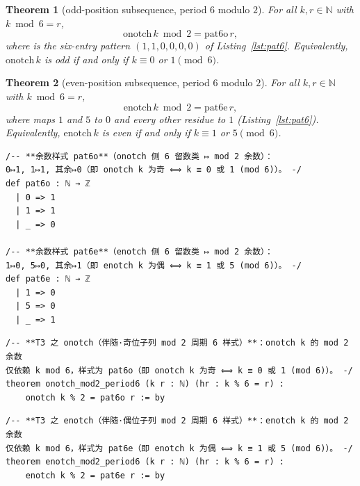\documentclass[11pt]{article}
\newtheorem{theorem}{Theorem}
\theoremstyle{definition}
\begin{document}
\begin{theorem}[odd-position subsequence, period $6$ modulo $2$]\label{thm:pat6o}
For all $k,r\in\mathbb{N}$ with $k\bmod 6=r$,
\[
  \mathrm{onotch}\,k \bmod 2 = \mathrm{pat6o}\,r,
\]
where  is the six-entry pattern $(1,1,0,0,0,0)$ of
Listing~\ref{lst:pat6}. Equivalently, $\mathrm{onotch}\,k$ is odd if and only
if $k\equiv 0$ or $1\pmod 6$.
\end{theorem}

\begin{theorem}[even-position subsequence, period $6$ modulo $2$]\label{thm:pat6e}
For all $k,r\in\mathbb{N}$ with $k\bmod 6=r$,
\[
  \mathrm{enotch}\,k \bmod 2 = \mathrm{pat6e}\,r,
\]
where  maps $1$ and $5$ to $0$ and every other residue to $1$
(Listing~\ref{lst:pat6}). Equivalently, $\mathrm{enotch}\,k$ is even if and
only if $k\equiv 1$ or $5\pmod 6$.
\end{theorem}

\begin{lstlisting}[caption={Pattern tables \lean{pat6o} and \lean{pat6e},
verbatim from the frozen statement file (lines 119--131, sha256
\texttt{16744fd3}).},label={lst:pat6}]
/-- **余数样式 pat6o**（onotch 侧 6 留数类 ↦ mod 2 余数）：
0↦1, 1↦1, 其余↦0（即 onotch k 为奇 ⟺ k ≡ 0 或 1 (mod 6)）。 -/
def pat6o : ℕ → ℤ
  | 0 => 1
  | 1 => 1
  | _ => 0

/-- **余数样式 pat6e**（enotch 侧 6 留数类 ↦ mod 2 余数）：
1↦0, 5↦0, 其余↦1（即 enotch k 为偶 ⟺ k ≡ 1 或 5 (mod 6)）。 -/
def pat6e : ℕ → ℤ
  | 1 => 0
  | 5 => 0
  | _ => 1
\end{lstlisting}

\begin{lstlisting}[caption={Theorem~\ref{thm:pat6o}, verbatim from the frozen
statement file (lines 133--136, sha256 \texttt{16744fd3}); the listing stops at
the theorem's \texttt{:= by} line.},label={lst:t3ostmt}]
/-- **T3 之 onotch（伴随·奇位子列 mod 2 周期 6 样式）**：onotch k 的 mod 2 余数
仅依赖 k mod 6，样式为 pat6o（即 onotch k 为奇 ⟺ k ≡ 0 或 1 (mod 6)）。 -/
theorem onotch_mod2_period6 (k r : ℕ) (hr : k % 6 = r) :
    onotch k % 2 = pat6o r := by
\end{lstlisting}

\begin{lstlisting}[caption={Theorem~\ref{thm:pat6e}, verbatim from the frozen
statement file (lines 139--142, sha256 \texttt{16744fd3}); the listing stops at
the theorem's \texttt{:= by} line.},label={lst:t3estmt}]
/-- **T3 之 enotch（伴随·偶位子列 mod 2 周期 6 样式）**：enotch k 的 mod 2 余数
仅依赖 k mod 6，样式为 pat6e（即 enotch k 为偶 ⟺ k ≡ 1 或 5 (mod 6)）。 -/
theorem enotch_mod2_period6 (k r : ℕ) (hr : k % 6 = r) :
    enotch k % 2 = pat6e r := by
\end{lstlisting}
\end{document}
